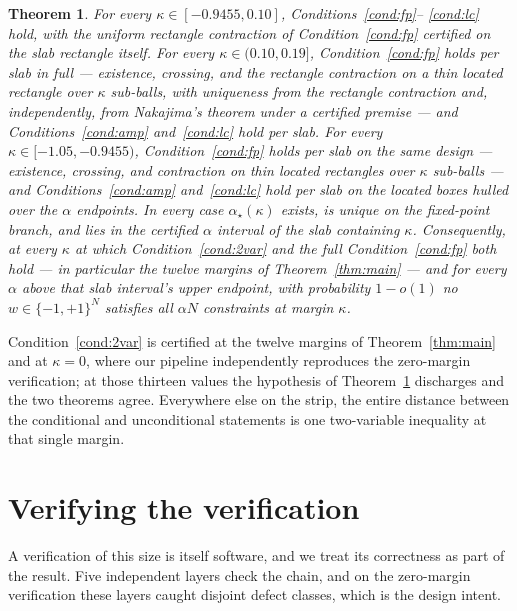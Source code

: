 \documentclass[11pt]{article}
\newtheorem{theorem}{Theorem}
\theoremstyle{remark}
\begin{document}
\begin{theorem}\label{thm:strip}
For every $\kappa\in[-0.9455,0.10]$, Conditions~\ref{cond:fp}--%
\ref{cond:lc} hold, with the uniform rectangle contraction of
Condition~\ref{cond:fp} certified on the slab rectangle itself.  For
every $\kappa\in(0.10,0.19]$, Condition~\ref{cond:fp} holds per slab
in full --- existence, crossing, and the rectangle contraction on a
thin located rectangle over $\kappa$ sub-balls, with uniqueness from
the rectangle contraction and, independently, from Nakajima's
theorem under a certified premise --- and Conditions~\ref{cond:amp}
and~\ref{cond:lc} hold per slab.  For every
$\kappa\in[-1.05,-0.9455)$, Condition~\ref{cond:fp} holds per slab
on the same design --- existence, crossing, and contraction on thin
located rectangles over $\kappa$ sub-balls --- and
Conditions~\ref{cond:amp} and~\ref{cond:lc} hold per slab on the
located boxes hulled over the $\alpha$ endpoints.  In every case
$\alpha_\star(\kappa)$ exists, is unique on the fixed-point branch,
and lies in the certified $\alpha$ interval of the slab containing
$\kappa$.  Consequently, at every $\kappa$ at which
Condition~\ref{cond:2var} and the full Condition~\ref{cond:fp} both
hold --- in particular the twelve margins of
Theorem~\ref{thm:main} --- and for every $\alpha$ above that slab
interval's upper endpoint, with probability $1-o(1)$ no
$w\in\{-1,+1\}^N$ satisfies all $\alpha N$ constraints at margin
$\kappa$.
\end{theorem}

Condition~\ref{cond:2var} is certified at the twelve margins of
Theorem~\ref{thm:main} and at $\kappa=0$, where our pipeline
independently reproduces the zero-margin verification; at those
thirteen values the hypothesis of Theorem~\ref{thm:strip} discharges and the
two theorems agree.  Everywhere else on the strip, the entire
distance between the conditional and unconditional statements is one
two-variable inequality at that single margin.





\section{Verifying the verification}\label{sec:metaverify}

A verification of this size is itself software, and we treat its
correctness as part of the result.  Five independent layers check the
chain, and on the zero-margin verification these layers caught
disjoint defect classes, which is the design intent.
\end{document}
